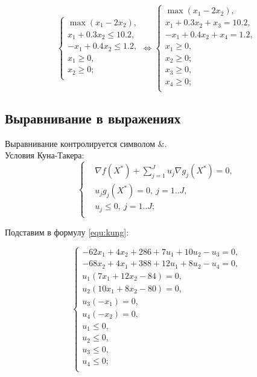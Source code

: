 \begin{equation}
	\left\{\begin{aligned}
		\max\left(x_1-2x_2\right), \\
		x_1+0.3x_2\leq 10.2, \\
		-x_1+0.4x_2\leq 1.2, \\
		x_1\geq 0, \\
		x_2\geq 0; \\
	\end{aligned}\right. \Longleftrightarrow
	\left\{\begin{aligned}
		\max\left(x_1-2x_2\right), \\
		x_1+0.3x_2+x_3=10.2, \\
		-x_1+0.4x_2+x_4=1.2, \\
		x_1\geq 0, \\
		x_2\geq 0; \\
		x_3\geq 0, \\
		x_4\geq 0; \\
	\end{aligned}\right.
\end{equation}

\subsection{Выравнивание в выражениях}

Выравнивание контролируется символом \&. \\

Условия Куна-Такера:
\begin{equation}
	\left\{\begin{aligned}
		&\nabla f(X^*)+\sum_{j=1}^{J} u_j \nabla g_j(X^*)=0,\\
		&u_j g_j(X^*)=0,~ j=1..J,\\
		&u_j \leq 0,~ j=1..J;\\
	\end{aligned}\right.
	\label{equ:kung}
\end{equation}

Подставим в формулу \vref{equ:kung}:

\begin{equation}
	\left\{\begin{aligned}
		-62x_1+4x_2+286+7u_1+10u_2-u_3=0,\\
		-68x_2+4x_1+388+12u_1+8u_2-u_4=0,\\
		u_1(7x_1+12x_2-84)=0,\\
		u_2(10x_1+8x_2-80)=0,\\
		u_3(-x_1)=0,\\
		u_4(-x_2)=0,\\
		u_1\leq 0,\\
		u_2\leq 0,\\
		u_3\leq 0,\\
		u_4\leq 0;\\
	\end{aligned}\right.
\end{equation}

